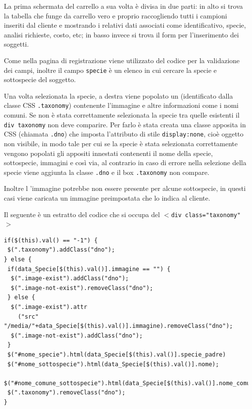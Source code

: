 La prima schermata del carrello a sua volta è divisa in due parti: in alto si trova la tabella che funge da carrello vero e proprio raccogliendo tutti i campioni inseriti dal cliente e mostrando i relativi dati associati come identificativo, specie, analisi richieste, costo, etc; in basso invece si trova il form per l'inserimento dei soggetti.

Come nella pagina di registrazione viene utilizzato del codice {\js} per la validazione dei campi, inoltre il campo \texttt{specie} è un elenco in cui cercare la specie e sottospecie del soggetto. 

Una volta selezionata la specie, a destra viene popolato un  (identificato dalla classe CSS \texttt{.taxonomy}) contenente l'immagine e altre informazioni come i nomi comuni. Se non è stata correttamente selezionata la specie tra quelle esistenti il \texttt{div taxonomy} non deve comparire. Per farlo è stata creata una classe apposita in CSS (chiamata \texttt{.dno}) che imposta l'attributo di stile \texttt{display:none}, cioè oggetto non visibile, in modo tale per cui se la specie è stata selezionata correttamente vengono popolati gli appositi  innestati contenenti il nome della specie, sottospecie, immagini e così via, al contrario in caso di errore nella selezione della specie viene aggiunta la classe \texttt{.dno} e il box \texttt{.taxonomy} non compare.

Inoltre l 'immagine potrebbe non essere presente per alcune sottospecie, in questi casi viene caricata un immagine preimpostata che lo indica al cliente.

Il seguente è un estratto del codice che si occupa del $<$\texttt{div class="taxonomy"}$>$

\begin{footnotesize}
\begin{verbatim}
if($(this).val() == "-1") {
 $(".taxonomy").addClass("dno");
} else {
 if(data_Specie[$(this).val()].immagine == "") {
  $(".image-exist").addClass("dno");
  $(".image-not-exist").removeClass("dno");
 } else {
  $(".image-exist").attr
    ("src" "/media/"+data_Specie[$(this).val()].immagine).removeClass("dno");
  $(".image-not-exist").addClass("dno");
 }
 $("#nome_specie").html(data_Specie[$(this).val()].specie_padre)
 $("#nome_sottospecie").html(data_Specie[$(this).val()].nome);
 $("#nome_comune_sottospecie").html(data_Specie[$(this).val()].nome_comune);
 $(".taxonomy").removeClass("dno");
} 
 
\end{verbatim}
\end{footnotesize}

